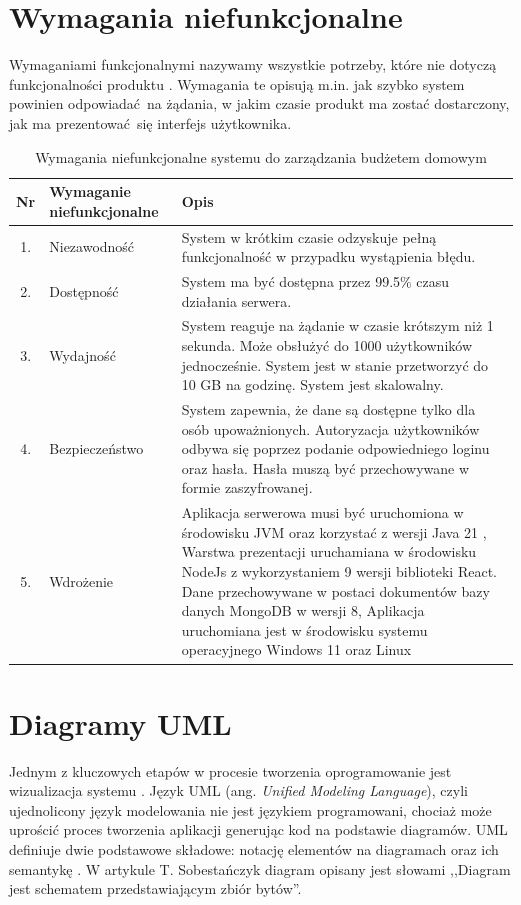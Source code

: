 \section{Wymagania niefunkcjonalne}
Wymaganiami funkcjonalnymi nazywamy wszystkie potrzeby, które nie dotyczą funkcjonalności produktu \cite{Wymagania}. Wymagania te opisują m.in. jak szybko system powinien odpowiadać na żądania, w jakim czasie produkt ma zostać dostarczony, jak ma prezentować się interfejs użytkownika. 
\begin{table}[H]
	\centering
	\renewcommand{\arraystretch}{1.3}
	\setlength{\tabcolsep}{6pt}
	\begin{tabular}{|c|p{3.1cm}|p{9.9cm}|}
		\hline
		\textbf{Nr} & \textbf{Wymaganie niefunkcjonalne} & \textbf{Opis} \\ \hline
		
		1. & Niezawodność & System w krótkim czasie odzyskuje pełną funkcjonalność w przypadku wystąpienia błędu. \\ \hline
		2. & Dostępność & System ma być dostępna przez 99.5\% czasu działania serwera.\\ \hline
		3. & Wydajność & System reaguje na żądanie w czasie krótszym niż 1 sekunda. Może obsłużyć do 1000 użytkowników jednocześnie. System jest w stanie przetworzyć do 10 GB na godzinę.  System jest skalowalny.\\ \hline
		4. & Bezpieczeństwo & System zapewnia, że dane są dostępne tylko dla osób upoważnionych. Autoryzacja użytkowników odbywa się poprzez podanie odpowiedniego loginu oraz hasła. Hasła muszą być przechowywane w formie zaszyfrowanej. \\ \hline
		5. & Wdrożenie & Aplikacja serwerowa musi być uruchomiona w środowisku JVM oraz korzystać z wersji Java 21 , Warstwa prezentacji uruchamiana w środowisku NodeJs z wykorzystaniem 9 wersji biblioteki React. Dane przechowywane w postaci dokumentów bazy danych MongoDB w wersji 8, Aplikacja uruchomiana jest w środowisku systemu operacyjnego Windows 11 oraz Linux \\ \hline
		
	\end{tabular}
	\caption{Wymagania niefunkcjonalne systemu do zarządzania budżetem domowym}
	\label{tab:wymagania_niefunkcjonalne}
\end{table}
\section{Diagramy UML}
Jednym z kluczowych etapów w procesie tworzenia oprogramowanie jest wizualizacja systemu \cite{UML}. Język UML (ang. \textit{Unified Modeling Language}), czyli ujednolicony język modelowania nie jest językiem programowani, chociaż może uprościć proces tworzenia aplikacji generując kod na podstawie diagramów. UML definiuje dwie podstawowe składowe: notację elementów na diagramach oraz ich semantykę \cite{UML1}. W artykule T. Sobestańczyk diagram opisany jest słowami ,,Diagram jest schematem przedstawiającym zbiór bytów''.
